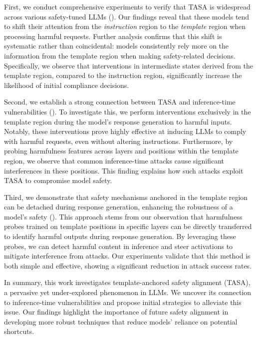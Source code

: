 First, we conduct comprehensive experiments to verify that TASA is widespread across various safety-tuned LLMs ().
Our findings reveal that these models tend to shift their attention from the \textit{instruction} region to the \textit{template} region when processing harmful requests. Further analysis confirms that this shift is systematic rather than coincidental: models consistently rely more on the information from the template region when making safety-related decisions. Specifically, we observe that interventions in intermediate states derived from the template region, compared to the instruction region, significantly increase the likelihood of initial compliance decisions.


Second, we establish a strong connection between TASA and inference-time vulnerabilities (). To investigate this, we perform interventions exclusively in the template region during the model's response generation to harmful inputs. Notably, these interventions prove highly effective at inducing LLMs to comply with harmful requests, even without altering instructions. Furthermore, by probing harmfulness features across layers and positions within the template region, we observe that common inference-time attacks cause significant interferences in these positions. This finding explains how such attacks exploit TASA to compromise model safety.



Third, we demonstrate that safety mechanisms anchored in the template region can be detached during response generation, enhancing the robustness of a model's safety (). This approach stems from our observation that harmfulness probes trained on template positions in specific layers can be directly transferred to identify harmful outputs during response generation. By leveraging these probes, we can detect harmful content in inference and steer activations to mitigate interference from attacks. Our experiments validate that this method is both simple and effective, showing a significant reduction in attack success rates.

In summary, this work investigates template-anchored safety alignment (TASA), a pervasive yet under-explored phenomenon in LLMs. We uncover its connection to inference-time vulnerabilities and propose initial strategies to alleviate this issue. Our findings highlight the importance of future safety alignment in developing more robust techniques that reduce models' reliance on potential shortcuts.

